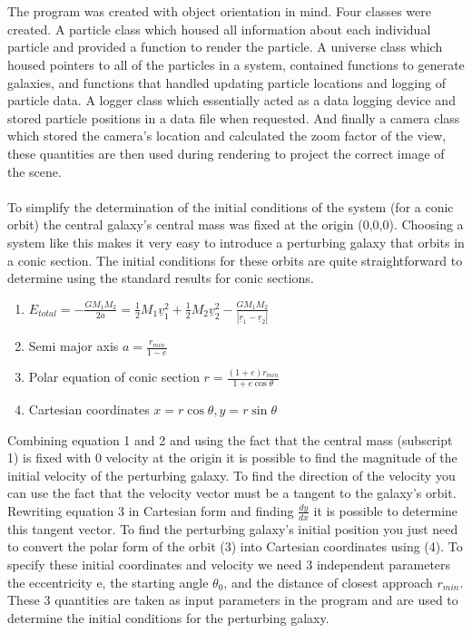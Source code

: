 \documentclass[10pt,a4paper]{article}
\begin{document}
\\
\\
The program was created with object orientation in mind. Four classes were created. A particle class which housed all information about each individual particle and provided a function to render the particle. A universe class which housed pointers to all of the particles in a system, contained functions to generate galaxies, and functions that handled updating particle locations and logging of particle data. A logger class which essentially acted as a data logging device and stored particle positions in a data file when requested. And finally a camera class which stored the camera's location and calculated the zoom factor of the view, these quantities are then used during rendering to project the correct image of the scene.
\\
\\
To simplify the determination of the initial conditions of the system (for a conic orbit) the central galaxy's central mass was fixed at the origin (0,0,0). Choosing a system like this makes it very easy to introduce a perturbing galaxy that orbits in a conic section. The initial conditions for these orbits are quite straightforward to determine using the standard results for conic sections.

\begin{enumerate}
\item $E_{total} = -\frac{G M_1 M_2}{2 a} =\frac{1}{2} M_1 \underline{v}_1^2 + \frac{1}{2} M_2 \underline{v}_2^2 -\frac{G M_1 M_2}{|\underline{r}_1-\underline{r}_2|}$
\item Semi major axis $a = \frac{r_{min}}{1-e}$
\item Polar equation of conic section $r = \frac{(1+e)r_{min}}{1+e\cos{\theta}}$
\item Cartesian coordinates $x=r\cos{\theta},y=r\sin{\theta}$
\end{enumerate}

Combining equation 1 and 2 and using the fact that the central mass (subscript 1) is fixed with 0 velocity at the origin it is possible to find the magnitude of the initial velocity of the perturbing galaxy. To find the direction of the velocity you can use the fact that the velocity vector must be a tangent to the galaxy's orbit. Rewriting equation 3 in Cartesian form and finding $\frac{dy}{dx}$ it is possible to determine this tangent vector. To find the perturbing galaxy's initial position you just need to convert the polar form of the orbit (3) into Cartesian coordinates using (4). To specify these initial coordinates and velocity we need 3 independent parameters the eccentricity e, the starting angle $\theta_0$, and the distance of closest approach $r_{min}$. These 3 quantities are taken as input parameters in the program and are used to determine the initial conditions for the perturbing galaxy.
\end{document}
